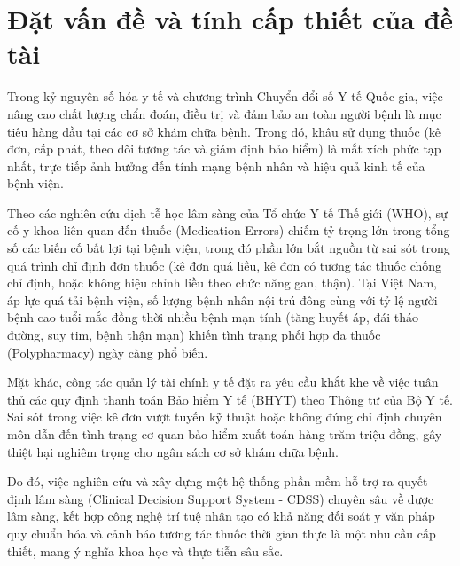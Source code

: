 \section{Đặt vấn đề và tính cấp thiết của đề tài}
\label{sec:background}

Trong kỷ nguyên số hóa y tế và chương trình Chuyển đổi số Y tế Quốc gia, việc nâng cao chất lượng chẩn đoán, điều trị và đảm bảo an toàn người bệnh là mục tiêu hàng đầu tại các cơ sở khám chữa bệnh. Trong đó, khâu sử dụng thuốc (kê đơn, cấp phát, theo dõi tương tác và giám định bảo hiểm) là mắt xích phức tạp nhất, trực tiếp ảnh hưởng đến tính mạng bệnh nhân và hiệu quả kinh tế của bệnh viện.

Theo các nghiên cứu dịch tễ học lâm sàng của Tổ chức Y tế Thế giới (WHO), sự cố y khoa liên quan đến thuốc (Medication Errors) chiếm tỷ trọng lớn trong tổng số các biến cố bất lợi tại bệnh viện, trong đó phần lớn bắt nguồn từ sai sót trong quá trình chỉ định đơn thuốc (kê đơn quá liều, kê đơn có tương tác thuốc chống chỉ định, hoặc không hiệu chỉnh liều theo chức năng gan, thận). Tại Việt Nam, áp lực quá tải bệnh viện, số lượng bệnh nhân nội trú đông cùng với tỷ lệ người bệnh cao tuổi mắc đồng thời nhiều bệnh mạn tính (tăng huyết áp, đái tháo đường, suy tim, bệnh thận mạn) khiến tình trạng phối hợp đa thuốc (Polypharmacy) ngày càng phổ biến.

Mặt khác, công tác quản lý tài chính y tế đặt ra yêu cầu khắt khe về việc tuân thủ các quy định thanh toán Bảo hiểm Y tế (BHYT) theo Thông tư của Bộ Y tế. Sai sót trong việc kê đơn vượt tuyến kỹ thuật hoặc không đúng chỉ định chuyên môn dẫn đến tình trạng cơ quan bảo hiểm xuất toán hàng trăm triệu đồng, gây thiệt hại nghiêm trọng cho ngân sách cơ sở khám chữa bệnh.

Do đó, việc nghiên cứu và xây dựng một hệ thống phần mềm hỗ trợ ra quyết định lâm sàng (Clinical Decision Support System - CDSS) chuyên sâu về dược lâm sàng, kết hợp công nghệ trí tuệ nhân tạo có khả năng đối soát y văn pháp quy chuẩn hóa và cảnh báo tương tác thuốc thời gian thực là một nhu cầu cấp thiết, mang ý nghĩa khoa học và thực tiễn sâu sắc.
